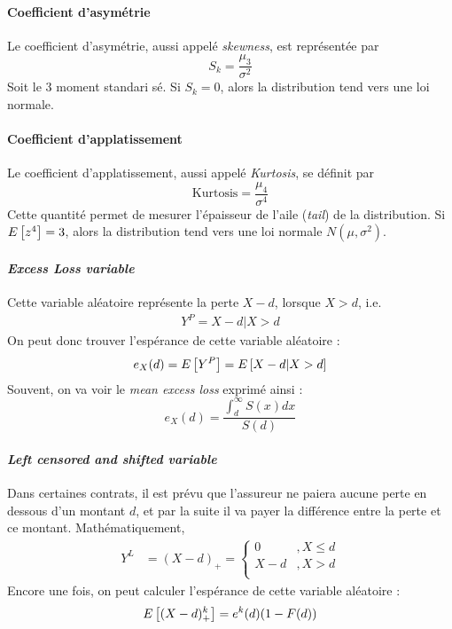 \documentclass[12pt, french]{report}
\begin{document}
\paragraph{Coefficient d'asymétrie}
Le coefficient d'asymétrie, aussi appelé \textit{skewness}, est représentée par
\begin{equation}
S_k = \frac{\mu_3}{\sigma^2}
\end{equation}
Soit le 3 moment standari	sé. Si $S_k = 0$, alors la distribution tend vers une loi normale.

\paragraph{Coefficient d'applatissement}
Le coefficient d'applatissement, aussi appelé \textit{Kurtosis}, se définit par
\begin{equation}
\text{Kurtosis} = \frac{\mu_4}{\sigma^4}
\end{equation}
Cette quantité permet de mesurer l'épaisseur de l'aile (\textit{tail}) de la distribution. Si $E \left[ z^4 \right] =3$, alors la distribution tend vers une loi normale $N(\mu, \sigma^2)$.

\paragraph{\textit{Excess Loss variable}}
Cette variable aléatoire représente la perte $X - d$, lorsque $X > d$, i.e.
\begin{align*}
Y^P = X - d | X > d
\end{align*}
On peut donc trouver l'espérance de cette variable aléatoire : 
\begin{equation}
e_X(d)  = E \left[ Y^P \right] = E \left[ X - d | X > d \right]
\end{equation}
Souvent, on va voir le \textit{mean excess loss} exprimé ainsi : 
\begin{equation}
e_X(d) = \frac{\int_{d}^{\infty} S(x) dx}{S(d)}
\end{equation}

\paragraph{\textit{Left censored and shifted variable}}
Dans certaines contrats, il est prévu que l'assureur ne paiera aucune perte en dessous d'un montant $d$, et par la suite il va payer la différence entre la perte et ce montant. Mathématiquement,
\begin{align*}
Y^L	& = (X-d)_+ = \begin{cases}
0	& ,X \leq d \\
X - d & ,X > d \\
\end{cases}
\end{align*}
Encore une fois, on peut calculer l'espérance de cette variable aléatoire : 
\begin{equation}
E \left[ (X-d)_+^k \right] = e^k(d) (1 - F(d))
\end{equation}
\end{document}
